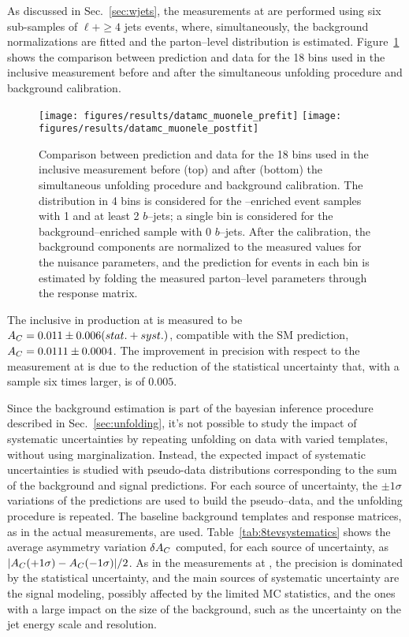 As discussed in Sec.~\ref{sec:wjets}, the measurements at \eighttev{}
are performed using six sub-samples of $\ell{}+\ge4$ jets events,
where, simultaneously, the background normalizations are fitted and
the parton--level \dy{} distribution is
estimated. Figure~\ref{fig:dy8tev} shows the comparison between
prediction and data for the 18 bins used in the inclusive \ac{}
measurement before and after the simultaneous unfolding procedure and
background calibration.
\begin{figure}[!htb]\centering
  \texttt{[image: figures/results/datamc\_muonele\_prefit]} 
  \texttt{[image: figures/results/datamc\_muonele\_postfit]} 
  \caption{Comparison between prediction and data for the 18 bins used
  in the inclusive \ac{} measurement before (top) and after (bottom)
  the simultaneous unfolding procedure and background calibration. The
  \dy{} distribution in 4 bins is considered for the
  \ttbar{}--enriched event samples with 1 and at least 2 $b$--jets; a
  single bin is considered for the background--enriched sample with 0
  $b$--jets. After the calibration, the background components are
  normalized to the measured values for the nuisance parameters, and
  the prediction for \ttbar{} events in each bin is estimated by
  folding the measured parton--level parameters through the response
  matrix.}
  \label{fig:dy8tev}
\end{figure}
The inclusive \ac{} in \ttbar{} production at \eighttev{} is measured to be
$A_C{}= 0.011\pm0.006(stat.+syst.)$, compatible with the SM prediction,
$A_C{}=0.0111\pm0.0004$. The improvement in precision with respect to
the measurement at \seventev{} is due to the reduction of the
statistical uncertainty that, with a \ttbar{} sample six times larger,
is of $0.005$. 

Since the background estimation is part of the bayesian inference
procedure described in Sec.~\ref{sec:unfolding}, it's not possible to
study the impact of systematic uncertainties by repeating unfolding on data with
varied templates, without using marginalization. Instead, the expected
impact of systematic uncertainties is studied with pseudo-data distributions
corresponding to the sum of the background and signal predictions.
For each source of uncertainty, the $\pm{}1\sigma$ variations of the
predictions are used to build the pseudo--data, and the unfolding
procedure is repeated. The baseline background templates and response
matrices, as in the actual measurements, are used.
Table~\ref{tab:8tevsystematics} shows the average asymmetry variation
$\delta{\ensuremath{A_C}{}}$ computed, for each source of uncertainty, as
$|A_C{}(+1\sigma)-A_C{}(-1\sigma)|/2$.
As in the measurements at \seventev{}, the precision is dominated by
the statistical uncertainty, and the main sources of systematic
uncertainty are the signal modeling, possibly affected by the limited
MC statistics, and the ones with a large impact on the size of the
\wjets{} background, such as the uncertainty on the jet energy scale
and resolution. 

